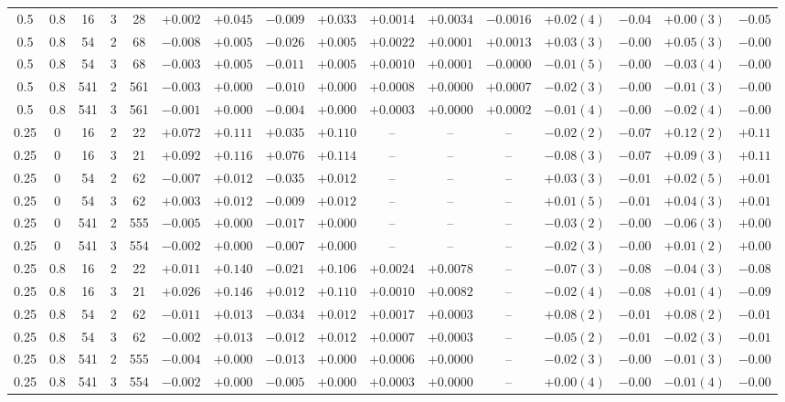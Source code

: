 \documentclass[11pt,aps,preprint,nofootinbib,superscriptaddress,tightenlines]{revtex4-2}
\begin{document}
\begin{center}
{\begin{tabular}{cccc c cc cc ccc cc cc}
0.5 & 0.8 & 16 & 3 & 28 & $+0.002$ & $+0.045$ & $-0.009$ & $+0.033$ & $+0.0014$ & $+0.0034$ & $-0.0016$ & $+0.02(4)$ & $-0.04$ & $+0.00(3)$ & $-0.05$ \\
0.5 & 0.8 & 54 & 2 & 68 & $-0.008$ & $+0.005$ & $-0.026$ & $+0.005$ & $+0.0022$ & $+0.0001$ & $+0.0013$ & $+0.03(3)$ & $-0.00$ & $+0.05(3)$ & $-0.00$ \\
0.5 & 0.8 & 54 & 3 & 68 & $-0.003$ & $+0.005$ & $-0.011$ & $+0.005$ & $+0.0010$ & $+0.0001$ & $-0.0000$ & $-0.01(5)$ & $-0.00$ & $-0.03(4)$ & $-0.00$ \\
0.5 & 0.8 & 541 & 2 & 561 & $-0.003$ & $+0.000$ & $-0.010$ & $+0.000$ & $+0.0008$ & $+0.0000$ & $+0.0007$ & $-0.02(3)$ & $-0.00$ & $-0.01(3)$ & $-0.00$ \\
0.5 & 0.8 & 541 & 3 & 561 & $-0.001$ & $+0.000$ & $-0.004$ & $+0.000$ & $+0.0003$ & $+0.0000$ & $+0.0002$ & $-0.01(4)$ & $-0.00$ & $-0.02(4)$ & $-0.00$ \\
\hline
0.25 & 0 & 16 & 2 & 22 & $+0.072$ & $+0.111$ & $+0.035$ & $+0.110$ & -- & -- & -- & $-0.02(2)$ & $-0.07$ & $+0.12(2)$ & $+0.11$ \\
0.25 & 0 & 16 & 3 & 21 & $+0.092$ & $+0.116$ & $+0.076$ & $+0.114$ & -- & -- & -- & $-0.08(3)$ & $-0.07$ & $+0.09(3)$ & $+0.11$ \\
0.25 & 0 & 54 & 2 & 62 & $-0.007$ & $+0.012$ & $-0.035$ & $+0.012$ & -- & -- & -- & $+0.03(3)$ & $-0.01$ & $+0.02(5)$ & $+0.01$ \\
0.25 & 0 & 54 & 3 & 62 & $+0.003$ & $+0.012$ & $-0.009$ & $+0.012$ & -- & -- & -- & $+0.01(5)$ & $-0.01$ & $+0.04(3)$ & $+0.01$ \\
0.25 & 0 & 541 & 2 & 555 & $-0.005$ & $+0.000$ & $-0.017$ & $+0.000$ & -- & -- & -- & $-0.03(2)$ & $-0.00$ & $-0.06(3)$ & $+0.00$ \\
0.25 & 0 & 541 & 3 & 554 & $-0.002$ & $+0.000$ & $-0.007$ & $+0.000$ & -- & -- & -- & $-0.02(3)$ & $-0.00$ & $+0.01(2)$ & $+0.00$ \\
\hline
0.25 & 0.8 & 16 & 2 & 22 & $+0.011$ & $+0.140$ & $-0.021$ & $+0.106$ & $+0.0024$ & $+0.0078$ & -- & $-0.07(3)$ & $-0.08$ & $-0.04(3)$ & $-0.08$ \\
0.25 & 0.8 & 16 & 3 & 21 & $+0.026$ & $+0.146$ & $+0.012$ & $+0.110$ & $+0.0010$ & $+0.0082$ & -- & $-0.02(4)$ & $-0.08$ & $+0.01(4)$ & $-0.09$ \\
0.25 & 0.8 & 54 & 2 & 62 & $-0.011$ & $+0.013$ & $-0.034$ & $+0.012$ & $+0.0017$ & $+0.0003$ & -- & $+0.08(2)$ & $-0.01$ & $+0.08(2)$ & $-0.01$ \\
0.25 & 0.8 & 54 & 3 & 62 & $-0.002$ & $+0.013$ & $-0.012$ & $+0.012$ & $+0.0007$ & $+0.0003$ & -- & $-0.05(2)$ & $-0.01$ & $-0.02(3)$ & $-0.01$ \\
0.25 & 0.8 & 541 & 2 & 555 & $-0.004$ & $+0.000$ & $-0.013$ & $+0.000$ & $+0.0006$ & $+0.0000$ & -- & $-0.02(3)$ & $-0.00$ & $-0.01(3)$ & $-0.00$ \\
0.25 & 0.8 & 541 & 3 & 554 & $-0.002$ & $+0.000$ & $-0.005$ & $+0.000$ & $+0.0003$ & $+0.0000$ & -- & $+0.00(4)$ & $-0.00$ & $-0.01(4)$ & $-0.00$ \\
\bottomrule
\end{tabular}}
\end{center}
\end{document}
